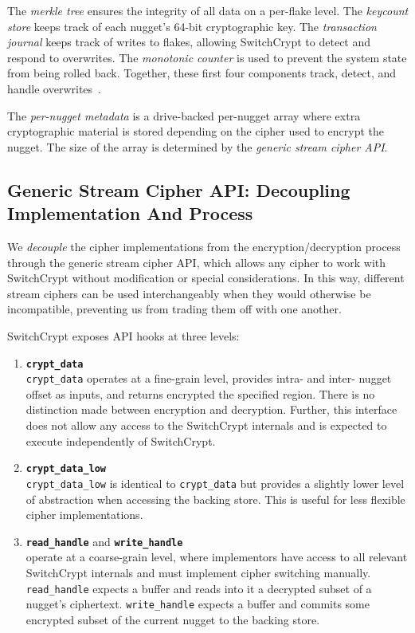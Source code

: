The \emph{merkle tree} ensures the integrity of all data on a per-flake level.
The \emph{keycount store} keeps track of each nugget's 64-bit cryptographic key.
The \emph{transaction journal} keeps track of writes to flakes, allowing
SwitchCrypt to detect and respond to overwrites. The \emph{monotonic counter} is
used to prevent the system state from being rolled back. Together, these first
four components track, detect, and handle overwrites~\cite{StrongBox}.

The \emph{per-nugget metadata} is a drive-backed per-nugget array where extra
cryptographic material is stored depending on the cipher used to encrypt the
nugget. The size of the array is determined by the \emph{generic stream cipher
API}.

\subsection{Generic Stream Cipher API: Decoupling Implementation And Process} \label{subsec:api}

We \emph{decouple} the cipher implementations from the encryption/decryption
process through the generic stream cipher API, which allows any cipher to work
with SwitchCrypt without modification or special considerations. In this way,
different stream ciphers can be used interchangeably when they would otherwise
be incompatible, preventing us from trading them off with one another.

SwitchCrypt exposes API hooks at three levels:

\begin{enumerate}
   \item \textbf{\texttt{crypt\_data}}\\\texttt{crypt\_data}
   operates at a fine-grain level, provides intra- and inter- nugget offset as
    inputs, and returns encrypted the specified region. There is no distinction
    made between encryption and decryption. Further, this interface does not
    allow any access to the SwitchCrypt internals and is expected to execute
    independently of SwitchCrypt.

   \item \textbf{\texttt{crypt\_data\_low}}\\\texttt{crypt\_data\_low}
   is identical to \texttt{crypt\_data} but provides a slightly lower level of
   abstraction when accessing the backing store. This is useful for less
   flexible cipher implementations.

   \item \textbf{\texttt{read\_handle}} and \textbf{\texttt{write\_handle}}\\
   operate at a coarse-grain level, where implementors have access to all
   relevant SwitchCrypt internals and must implement cipher switching manually.
   \texttt{read\_handle} expects a buffer and reads into it a decrypted subset
   of a nugget's ciphertext. \texttt{write\_handle} expects a buffer
   and commits some encrypted subset of the current nugget to the backing store.
\end{enumerate}


